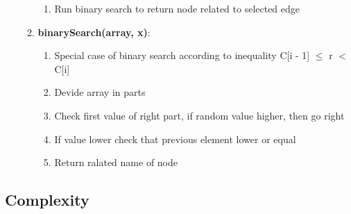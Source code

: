 \begin{itemize}
\begin{enumerate}
\begin{enumerate}
			\item  Run binary search  to return node related to selected edge 
			\end{enumerate}
		\item  \textbf{binarySearch(array, x)}:
			\begin{enumerate}
			\item  Special case of binary search according to inequality C[i - 1] $\leq$ r $<$ C[i]
			\item  Devide array in parts
			\item  Check first value of right part, if random value higher, then go right
			\item  If value lower check that previous element lower or equal 
			\item  Return ralated name of node 
			\end{enumerate}
	\end{enumerate}

\end{itemize}



\subsection{Complexity}



\pagebreak